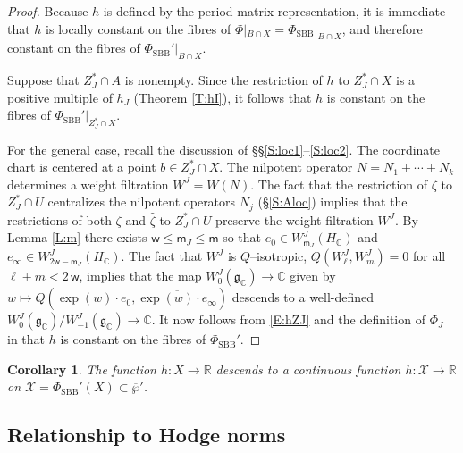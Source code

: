 \documentclass[12pt]{amsart}
\numberwithin{equation}{section}
\numberwithin{table}{section}
\def\z{\zeta}
\def\bC{\mathbb{C}}
\def\fg{\mathfrak{g}}
\def\sfm{\mathsf{m}}
\def\bR{\mathbb{R}}
\def\sfw{\mathsf{w}}
\def\sX{\mathscr{X}}
\newtheorem{corollary}[equation]{Corollary}
\theoremstyle{definition}
\theoremstyle{definition}
\theoremstyle{remark}
\newtheorem{remark}[equation]{Remark}
\def\PhiS{\Phi_\mathrm{SBB}}
\def\hPhiS{\Phi_\mathrm{SBB}'}
\def\hatP{\overline{\wp}{}'}
\begin{document}
\begin{proof}
Because $h$ is defined by the period matrix representation, it is immediate that $h$ is locally constant on the fibres of $\Phi|_{B\cap X} = \PhiS|_{B \cap X}$, and therefore constant on the fibres of $\hPhiS|_{B\cap X}$.   

Suppose that $Z_J^* \cap A$ is nonempty.  Since the restriction of $h$ to $Z_J^* \cap X$ is a positive multiple of $h_J$ (Theorem \ref{T:hI}), it follows that $h$ is constant on the fibres of $\hPhiS|_{Z_J^* \cap X}$.

For the general case, recall the discussion of \S\S\ref{S:loc1}--\ref{S:loc2}.  The coordinate chart is centered at a point $b \in Z_J^* \cap X$.  The nilpotent operator $N = N_1+\cdots+N_k$ determines a weight filtration $W^J = W(N)$.  The fact that the restriction of $\z$ to $Z_J^* \cap U$ centralizes the nilpotent operators $N_j$ (\S\ref{S:Aloc}) implies that the restrictions of both $\z$ and $\hat\z$ to $Z_J^* \cap U$ preserve the weight filtration $W^J$.  By Lemma \ref{L:m} there exists $\sfw \le \sfm_J \le \sfm$ so that $e_0 \in W^J_{\sfm_J}(H_\bC)$ and $e_\infty \in W^J_{2\sfw-\sfm_J}(H_\bC)$.  The fact that $W^J$ is $Q$--isotropic, $Q(W^J_\ell , W^J_m) = 0$ for all $\ell+m < 2\,\sfw$, implies that the map $W^J_0(\fg_\bC) \to \bC$ given by $w \mapsto Q(\exp(w) \cdot e_0 , \overline{\exp(w) \cdot e_\infty})$ descends to a well-defined $W^J_0(\fg_\bC)/W^J_{-1}(\fg_\bC) \to \bC$.  It now follows from \eqref{E:hZJ} and the definition of $\Phi_J$ in \cite{GGR-part1} that $h$ is constant on the fibres of $\hPhiS$.
\end{proof}


\begin{corollary} \label{C:cnst}
The function $h : X \to \bR$ descends to a continuous function $h : \sX \to \bR$ on $\sX = \hPhiS(X) \subset \hatP$.
\end{corollary}


\subsection{Relationship to Hodge norms} \label{S:hI}
\end{document}
